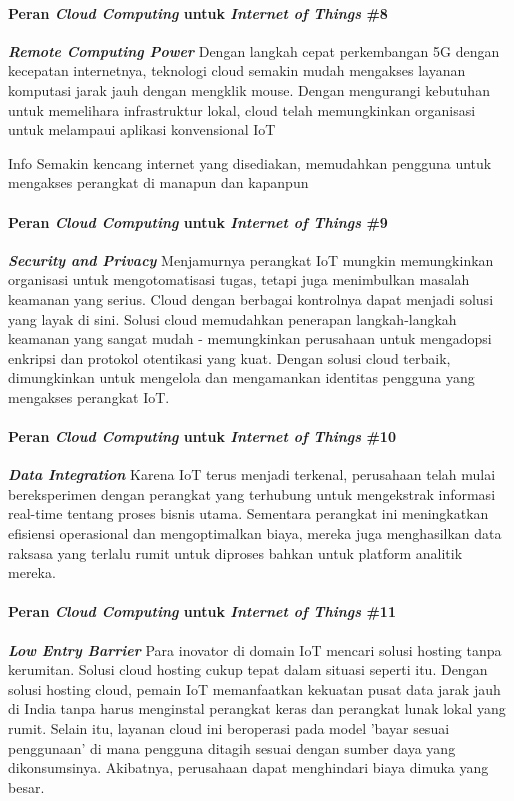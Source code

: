 \begin{frame}{\insertsectionhead}
	\framesubtitle{Peran \textit{Cloud Computing} untuk \textit{Internet of Things} \#8}
	\justifying 
	\textbf{\textit{Remote Computing Power}}
	\vfill
	Dengan langkah cepat perkembangan 5G dengan kecepatan internetnya, teknologi cloud semakin mudah mengakses layanan komputasi jarak jauh dengan mengklik mouse. Dengan mengurangi kebutuhan untuk memelihara infrastruktur lokal, cloud telah memungkinkan organisasi untuk melampaui aplikasi konvensional IoT
	\vfill
	\begin{block}{Info}
		Semakin kencang internet yang disediakan, memudahkan pengguna untuk mengakses perangkat di manapun dan kapanpun
	\end{block}
\end{frame}

\begin{frame}{\insertsectionhead}
	\framesubtitle{Peran \textit{Cloud Computing} untuk \textit{Internet of Things} \#9}
	\justifying 
	\textbf{\textit{Security and Privacy}}
	\vfill
	Menjamurnya perangkat IoT mungkin memungkinkan organisasi untuk mengotomatisasi tugas, tetapi juga menimbulkan masalah keamanan yang serius. Cloud dengan berbagai kontrolnya dapat menjadi solusi yang layak di sini. 
	\vfill
	Solusi cloud memudahkan penerapan langkah-langkah keamanan yang sangat mudah - memungkinkan perusahaan untuk mengadopsi enkripsi dan protokol otentikasi yang kuat. Dengan solusi cloud terbaik, dimungkinkan untuk mengelola dan mengamankan identitas pengguna yang mengakses perangkat IoT.
\end{frame}

\begin{frame}{\insertsectionhead}
	\framesubtitle{Peran \textit{Cloud Computing} untuk \textit{Internet of Things} \#10}
	\justifying 
	\textbf{\textit{Data Integration}}
	\vfill
	Karena IoT terus menjadi terkenal, perusahaan telah mulai bereksperimen dengan perangkat yang terhubung untuk mengekstrak informasi real-time tentang proses bisnis utama. 
	\vfill
	Sementara perangkat ini meningkatkan efisiensi operasional dan mengoptimalkan biaya, mereka juga menghasilkan data raksasa yang terlalu rumit untuk diproses bahkan untuk platform analitik mereka.
\end{frame}

\begin{frame}{\insertsectionhead}
	\framesubtitle{Peran \textit{Cloud Computing} untuk \textit{Internet of Things} \#11}
	\justifying 
	\textbf{\textit{Low Entry Barrier}}
	\vfill
	Para inovator di domain IoT mencari solusi hosting tanpa kerumitan. Solusi cloud hosting cukup tepat dalam situasi seperti itu. Dengan solusi hosting cloud, pemain IoT memanfaatkan kekuatan pusat data jarak jauh di India tanpa harus menginstal perangkat keras dan perangkat lunak lokal yang rumit. 
	\vfill
	Selain itu, layanan cloud ini beroperasi pada model 'bayar sesuai penggunaan' di mana pengguna ditagih sesuai dengan sumber daya yang dikonsumsinya. Akibatnya, perusahaan dapat menghindari biaya dimuka yang besar.
\end{frame}

